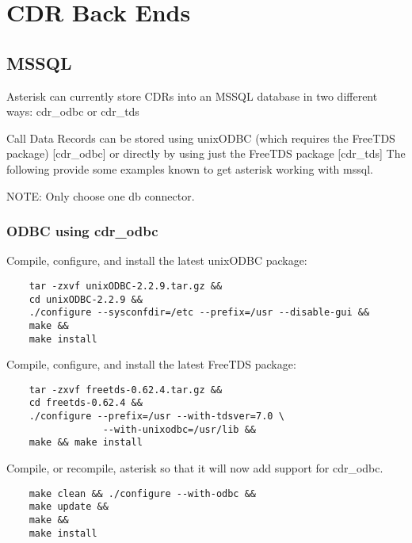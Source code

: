 \section{CDR Back Ends}

\subsection{MSSQL}

	Asterisk can currently store CDRs into an MSSQL database in
	two different ways:  cdr\_odbc or cdr\_tds
	
	Call Data Records can be stored using unixODBC (which requires
	the FreeTDS package) [cdr\_odbc] or directly by using just the
	FreeTDS package [cdr\_tds]  The following provide some
	examples known to get asterisk working with mssql.

	NOTE:  Only choose one db connector.

\subsubsection{ODBC using cdr\_odbc}
	Compile, configure, and install the latest unixODBC package:
\begin{astlisting}
\begin{verbatim}
	tar -zxvf unixODBC-2.2.9.tar.gz &&
	cd unixODBC-2.2.9 &&
	./configure --sysconfdir=/etc --prefix=/usr --disable-gui &&
	make &&
	make install
\end{verbatim}
\end{astlisting}

	Compile, configure, and install the latest FreeTDS package:
\begin{astlisting}
\begin{verbatim}
	tar -zxvf freetds-0.62.4.tar.gz &&
	cd freetds-0.62.4 &&
	./configure --prefix=/usr --with-tdsver=7.0 \
                 --with-unixodbc=/usr/lib &&
	make && make install
\end{verbatim}
\end{astlisting}

	Compile, or recompile, asterisk so that it will now add support
	for cdr\_odbc.
\begin{astlisting}
\begin{verbatim}
	make clean && ./configure --with-odbc &&
	make update &&
	make &&
	make install
\end{verbatim}
\end{astlisting}

